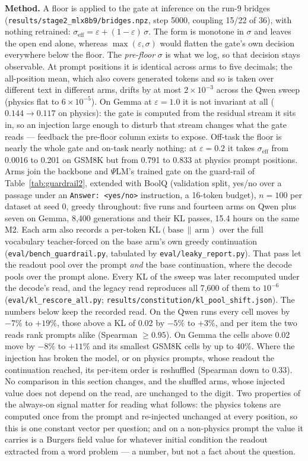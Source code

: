 \documentclass[11pt]{article}
\newcommand{\psilm}{$\Psi$LM}
\newcommand{\code}[1]{\texttt{#1}}
\begin{document}
\textbf{Method.} A floor is applied to the gate at inference on the run-9 bridges (\code{results/\allowbreak{}stage2\_\allowbreak{}mlx8b9/\allowbreak{}bridges.npz}, step 5000, coupling 15/22 of 36), with nothing retrained: $\sigma_{\text{eff}} = \varepsilon + (1-\varepsilon)\,\sigma$. The form is monotone in $\sigma$ and leaves the open end alone, whereas $\max(\varepsilon, \sigma)$ would flatten the gate's own decision everywhere below the floor. The \emph{pre-floor} $\sigma$ is what we log, so that decision stays observable. At prompt positions it is identical across arms to five decimals; the all-position mean, which also covers generated tokens and so is taken over different text in different arms, drifts by at most $2\times10^{-3}$ across the Qwen sweep (physics flat to $6\times10^{-5}$). On Gemma at $\varepsilon = 1.0$ it is not invariant at all ($0.144 \to 0.117$ on physics): the gate is computed from the residual stream it sits in, so an injection large enough to disturb that stream changes what the gate reads --- feedback the pre-floor column exists to expose. Off-task the floor is nearly the whole gate and on-task nearly nothing: at $\varepsilon = 0.2$ it takes $\sigma_{\text{eff}}$ from 0.0016 to 0.201 on GSM8K but from 0.791 to 0.833 at physics prompt positions. Arms join the backbone and \psilm{}'s trained gate on the guard-rail of Table~\ref{tab:guardrail2}, extended with BoolQ (validation split, yes/no over a passage under an \code{Answer:\ <yes/no>} instruction, a 16-token budget), $n{=}100$ per dataset at seed 0, greedy throughout: five runs and fourteen arms on Qwen plus seven on Gemma, 8,400 generations and their KL passes, 15.4 hours on the same M2. Each arm also records a per-token $\mathrm{KL}(\text{base}\,\|\,\text{arm})$ over the full vocabulary teacher-forced on the base arm's own greedy continuation (\code{eval/bench\_guardrail.py}, tabulated by \code{eval/leaky\_report.py}). That pass let the readout pool over the prompt \emph{and} the base continuation, where the decode pools over the prompt alone. Every KL of the sweep was later recomputed under the decode's read, and the legacy read reproduces all 7,600 of them to $10^{-6}$ (\code{eval/\allowbreak{}kl\_rescore\_all.py}; \code{results/\allowbreak{}constitution/\allowbreak{}kl\_pool\_shift.json}). The numbers below keep the recorded read. On the Qwen runs every cell moves by $-7\%$ to $+19\%$, those above a KL of 0.02 by $-5\%$ to $+3\%$, and per item the two reads rank prompts alike (Spearman $\ge 0.95$). On Gemma the cells above 0.02 move by $-8\%$ to $+11\%$ and its smallest GSM8K cells by up to 40\%. Where the injection has broken the model, or on physics prompts, whose readout the continuation reached, its per-item order is reshuffled (Spearman down to 0.33). No comparison in this section changes, and the shuffled arms, whose injected value does not depend on the read, are unchanged to the digit. Two properties of the always-on signal matter for reading what follows: the physics tokens are computed once from the prompt and re-injected unchanged at every position, so this is one constant vector per question; and on a non-physics prompt the value it carries is a Burgers field value for whatever initial condition the readout extracted from a word problem --- a number, but not a fact about the question.
\end{document}
